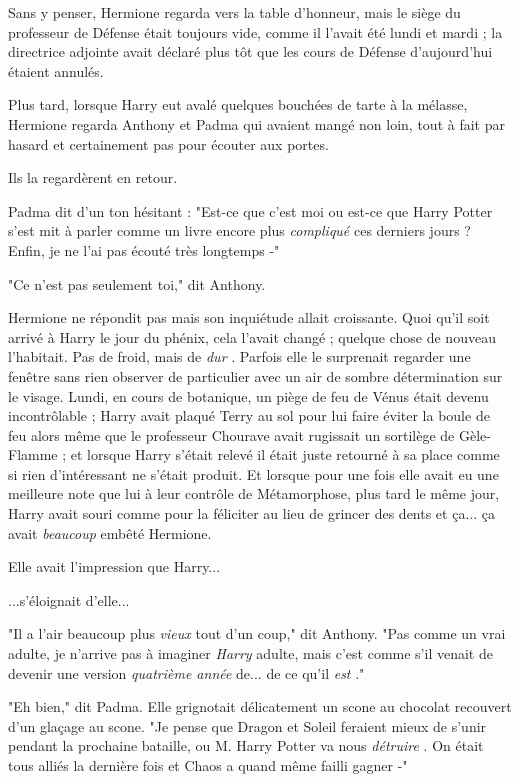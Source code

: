 Sans y penser, Hermione regarda vers la table d'honneur, mais le siège du professeur de Défense était toujours vide, comme il l'avait été lundi et mardi ; la directrice adjointe avait déclaré plus tôt que les cours de Défense d'aujourd'hui étaient annulés.

Plus tard, lorsque Harry eut avalé quelques bouchées de tarte à la mélasse, Hermione regarda Anthony et Padma qui avaient mangé non loin, tout à fait par hasard et certainement pas pour écouter aux portes.

Ils la regardèrent en retour.

Padma dit d'un ton hésitant : "Est-ce que c'est moi ou est-ce que Harry Potter s'est mit à parler comme un livre encore plus \emph{compliqué}  ces derniers jours ? Enfin, je ne l'ai pas écouté très longtemps -"

"Ce n'est pas seulement toi," dit Anthony.

Hermione ne répondit pas mais son inquiétude allait croissante. Quoi qu'il soit arrivé à Harry le jour du phénix, cela l'avait changé ; quelque chose de nouveau l'habitait. Pas de froid, mais de \emph{dur} . Parfois elle le surprenait regarder une fenêtre sans rien observer de particulier avec un air de sombre détermination sur le visage. Lundi, en cours de botanique, un piège de feu de Vénus était devenu incontrôlable ; Harry avait plaqué Terry au sol pour lui faire éviter la boule de feu alors même que le professeur Chourave avait rugissait un sortilège de Gèle-Flamme ; et lorsque Harry s'était relevé il était juste retourné à sa place comme si rien d'intéressant ne s'était produit. Et lorsque pour une fois elle avait eu une meilleure note que lui à leur contrôle de Métamorphose, plus tard le même jour, Harry avait souri comme pour la féliciter au lieu de grincer des dents et ça... ça avait \emph{beaucoup}  embêté Hermione.

Elle avait l'impression que Harry...

...s'éloignait d'elle...

"Il a l'air beaucoup plus \emph{vieux}  tout d'un coup," dit Anthony. "Pas comme un vrai adulte, je n'arrive pas à imaginer \emph{Harry}  adulte, mais c'est comme s'il venait de devenir une version \emph{quatrième année } de... de ce qu'il \emph{est} ."

"Eh bien," dit Padma. Elle grignotait délicatement un scone au chocolat recouvert d'un glaçage au scone. "Je pense que Dragon et Soleil feraient mieux de s'unir pendant la prochaine bataille, ou M. Harry Potter va nous \emph{détruire} . On était tous alliés la dernière fois et Chaos a quand même failli gagner -"

